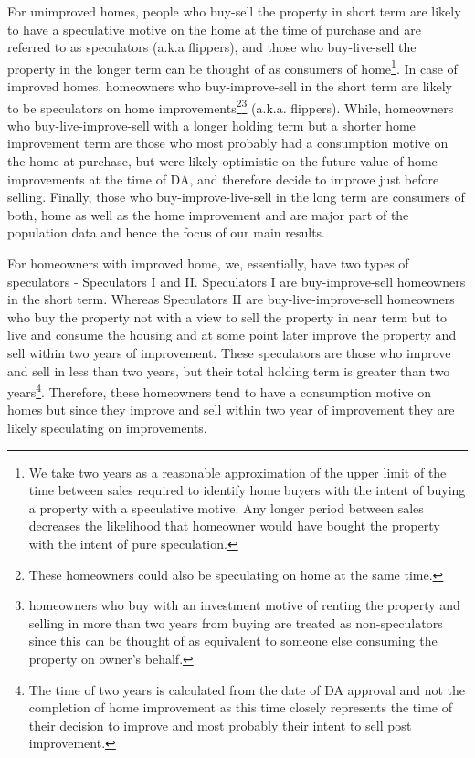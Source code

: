 \documentclass[AEJ,reqno, draftmode]{AEA} %
\begin{document}
For unimproved homes, people who buy-sell the property in short term are likely to have a speculative motive on the home at the time of purchase and are referred to as speculators (a.k.a flippers), and those who buy-live-sell the property in the longer term can be thought of as consumers of home\footnote{We take two years as a reasonable approximation of the upper limit of the time between sales required to identify home buyers with the intent of buying a property with a speculative motive. Any longer period between sales decreases the likelihood that homeowner would have bought the property with the intent of pure speculation.}. In case of improved homes, homeowners who buy-improve-sell in the short term are likely to be speculators on home improvements\footnote{These homeowners could also be speculating on home at the same time.}\footnote{homeowners who buy with an investment motive of renting the property and selling in more than two years from buying are treated as non-speculators since this can be thought of as equivalent to someone else consuming the property on owner's behalf.} (a.k.a. flippers). While, homeowners who buy-live-improve-sell with a longer holding term but a shorter home improvement term are those who most probably had a consumption motive on the home at purchase, but were likely optimistic on the future value of home improvements at the time of DA, and therefore decide to improve just before selling. Finally, those who buy-improve-live-sell in the long term are consumers of both, home as well as the home improvement and are major part of the population data and hence the focus of our main results.

For homeowners with improved home, we, essentially, have two types of speculators - Speculators I and II. Speculators I are buy-improve-sell homeowners in the short term. Whereas Speculators II are buy-live-improve-sell homeowners who buy the property not with a view to sell the property in near term but to live and consume the housing and at some point later improve the property and sell within two years of improvement. These speculators are those who improve and sell in less than two years, but their total holding term is greater than two years\footnote{The time of two years is calculated from the date of DA approval and not the completion of home improvement as this time closely represents the time of their decision to improve and most probably their intent to sell post improvement.}. Therefore, these homeowners tend to have a consumption motive on homes but since they improve and sell within two year of improvement they are likely speculating on improvements.
\end{document}
